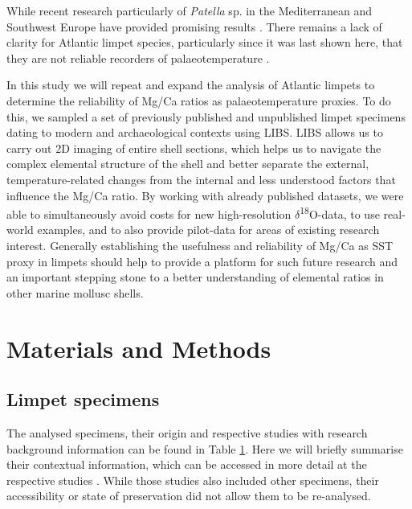 \documentclass[
  authoryear,
  preprint,
  3p]{elsarticle}
\begin{document}
While recent research particularly of \emph{Patella} sp. in the
Mediterranean and Southwest Europe have provided promising results
\citep{Hausmann2019-fi, Garcia-Escarzaga2015-jc, Garcia-Escarzaga2018-nf}.
There remains a lack of clarity for Atlantic limpet species,
particularly since it was last shown here, that they are not reliable
recorders of palaeotemperature \citep{Graniero2017-io}.

In this study we will repeat and expand the analysis of Atlantic limpets
to determine the reliability of Mg/Ca ratios as palaeotemperature
proxies. To do this, we sampled a set of previously published and
unpublished limpet specimens dating to modern and archaeological
contexts using LIBS. LIBS allows us to carry out 2D imaging of entire
shell sections, which helps us to navigate the complex elemental
structure of the shell and better separate the external,
temperature-related changes from the internal and less understood
factors that influence the Mg/Ca ratio. By working with already
published datasets, we were able to simultaneously avoid costs for new
high-resolution \(\delta\)\textsuperscript{18}O-data, to use real-world
examples, and to also provide pilot-data for areas of existing research
interest. Generally establishing the usefulness and reliability of Mg/Ca
as SST proxy in limpets should help to provide a platform for such
future research and an important stepping stone to a better
understanding of elemental ratios in other marine mollusc shells.

\section{Materials and Methods}\label{Methods}

\subsection{Limpet specimens}\label{limpet-specimens}

The analysed specimens, their origin and respective studies with
research background information can be found in Table
\hyperref[Table_1]{1}. Here we will briefly summarise their contextual
information, which can be accessed in more detail at the respective
studies \citep{Nicastro2020-ih, Surge2012-ba, Graniero2017-io}. While
those studies also included other specimens, their accessibility or
state of preservation did not allow them to be re-analysed.

\label{Table_1}
\fontsize{8pt}{8pt}\selectfont
\end{document}
